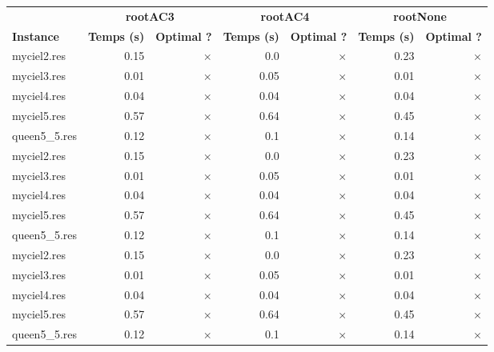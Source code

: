 \documentclass{article}
\begin{document}
\begin{center}
\renewcommand{\arraystretch}{1.4} 
\begin{tabular}{l
rrrrrr}
	\hline
 & \multicolumn{2}{c}{\textbf{rootAC3}} & \multicolumn{2}{c}{\textbf{rootAC4}} & \multicolumn{2}{c}{\textbf{rootNone}}\\
\textbf{Instance}  & \textbf{Temps (s)} & \textbf{Optimal ?}  & \textbf{Temps (s)} & \textbf{Optimal ?}  & \textbf{Temps (s)} & \textbf{Optimal ?} \\\hline

myciel2.res & 0.15 & 
$\times$
 & 0.0 & 
$\times$
 & 0.23 & 
$\times$
\\
myciel3.res & 0.01 & 
$\times$
 & 0.05 & 
$\times$
 & 0.01 & 
$\times$
\\
myciel4.res & 0.04 & 
$\times$
 & 0.04 & 
$\times$
 & 0.04 & 
$\times$
\\
myciel5.res & 0.57 & 
$\times$
 & 0.64 & 
$\times$
 & 0.45 & 
$\times$
\\
queen5\_5.res & 0.12 & 
$\times$
 & 0.1 & 
$\times$
 & 0.14 & 
$\times$
\\
myciel2.res & 0.15 & 
$\times$
 & 0.0 & 
$\times$
 & 0.23 & 
$\times$
\\
myciel3.res & 0.01 & 
$\times$
 & 0.05 & 
$\times$
 & 0.01 & 
$\times$
\\
myciel4.res & 0.04 & 
$\times$
 & 0.04 & 
$\times$
 & 0.04 & 
$\times$
\\
myciel5.res & 0.57 & 
$\times$
 & 0.64 & 
$\times$
 & 0.45 & 
$\times$
\\
queen5\_5.res & 0.12 & 
$\times$
 & 0.1 & 
$\times$
 & 0.14 & 
$\times$
\\
myciel2.res & 0.15 & 
$\times$
 & 0.0 & 
$\times$
 & 0.23 & 
$\times$
\\
myciel3.res & 0.01 & 
$\times$
 & 0.05 & 
$\times$
 & 0.01 & 
$\times$
\\
myciel4.res & 0.04 & 
$\times$
 & 0.04 & 
$\times$
 & 0.04 & 
$\times$
\\
myciel5.res & 0.57 & 
$\times$
 & 0.64 & 
$\times$
 & 0.45 & 
$\times$
\\
queen5\_5.res & 0.12 & 
$\times$
 & 0.1 & 
$\times$
 & 0.14 & 
$\times$
\\
\hline\end{tabular}
\end{center}
\end{document}
